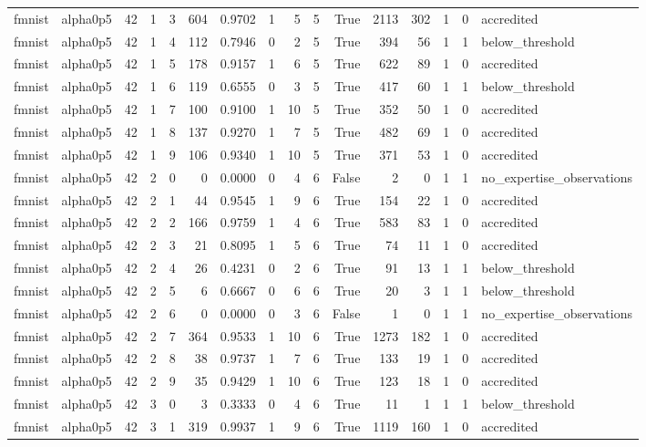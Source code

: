 \begin{tabular}{llrrrrrrrrrrrrrl}
fmnist & alpha0p5 & 42 & 1 & 3 & 604 & 0.9702 & 1 & 5 & 5 & True & 2113 & 302 & 1 & 0 & accredited \\
fmnist & alpha0p5 & 42 & 1 & 4 & 112 & 0.7946 & 0 & 2 & 5 & True & 394 & 56 & 1 & 1 & below\_threshold \\
fmnist & alpha0p5 & 42 & 1 & 5 & 178 & 0.9157 & 1 & 6 & 5 & True & 622 & 89 & 1 & 0 & accredited \\
fmnist & alpha0p5 & 42 & 1 & 6 & 119 & 0.6555 & 0 & 3 & 5 & True & 417 & 60 & 1 & 1 & below\_threshold \\
fmnist & alpha0p5 & 42 & 1 & 7 & 100 & 0.9100 & 1 & 10 & 5 & True & 352 & 50 & 1 & 0 & accredited \\
fmnist & alpha0p5 & 42 & 1 & 8 & 137 & 0.9270 & 1 & 7 & 5 & True & 482 & 69 & 1 & 0 & accredited \\
fmnist & alpha0p5 & 42 & 1 & 9 & 106 & 0.9340 & 1 & 10 & 5 & True & 371 & 53 & 1 & 0 & accredited \\
fmnist & alpha0p5 & 42 & 2 & 0 & 0 & 0.0000 & 0 & 4 & 6 & False & 2 & 0 & 1 & 1 & no\_expertise\_observations \\
fmnist & alpha0p5 & 42 & 2 & 1 & 44 & 0.9545 & 1 & 9 & 6 & True & 154 & 22 & 1 & 0 & accredited \\
fmnist & alpha0p5 & 42 & 2 & 2 & 166 & 0.9759 & 1 & 4 & 6 & True & 583 & 83 & 1 & 0 & accredited \\
fmnist & alpha0p5 & 42 & 2 & 3 & 21 & 0.8095 & 1 & 5 & 6 & True & 74 & 11 & 1 & 0 & accredited \\
fmnist & alpha0p5 & 42 & 2 & 4 & 26 & 0.4231 & 0 & 2 & 6 & True & 91 & 13 & 1 & 1 & below\_threshold \\
fmnist & alpha0p5 & 42 & 2 & 5 & 6 & 0.6667 & 0 & 6 & 6 & True & 20 & 3 & 1 & 1 & below\_threshold \\
fmnist & alpha0p5 & 42 & 2 & 6 & 0 & 0.0000 & 0 & 3 & 6 & False & 1 & 0 & 1 & 1 & no\_expertise\_observations \\
fmnist & alpha0p5 & 42 & 2 & 7 & 364 & 0.9533 & 1 & 10 & 6 & True & 1273 & 182 & 1 & 0 & accredited \\
fmnist & alpha0p5 & 42 & 2 & 8 & 38 & 0.9737 & 1 & 7 & 6 & True & 133 & 19 & 1 & 0 & accredited \\
fmnist & alpha0p5 & 42 & 2 & 9 & 35 & 0.9429 & 1 & 10 & 6 & True & 123 & 18 & 1 & 0 & accredited \\
fmnist & alpha0p5 & 42 & 3 & 0 & 3 & 0.3333 & 0 & 4 & 6 & True & 11 & 1 & 1 & 1 & below\_threshold \\
fmnist & alpha0p5 & 42 & 3 & 1 & 319 & 0.9937 & 1 & 9 & 6 & True & 1119 & 160 & 1 & 0 & accredited \\

\end{tabular}
